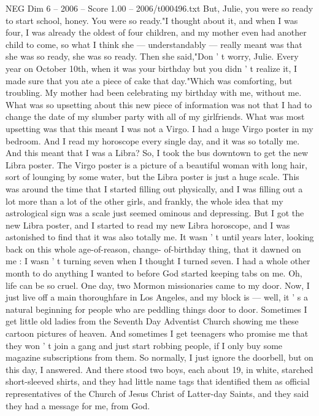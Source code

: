 \begin{textsample}{NEG Dim 6 – 2006 – Score 1.00 – 2006/t000496.txt}
But, Julie, you were so ready to start school, honey.
You were so ready."I thought about it, and when I was four, I was already the oldest of four children, and my mother even had another child to come, so what I think she — understandably — really meant was that she was so ready, she was so ready.
Then she said,"Don ' t worry, Julie.
Every year on October 10th, when it was your birthday but you didn ' t realize it, I made sure that you ate a piece of cake that day."Which was comforting, but troubling.
My mother had been celebrating my birthday with me, without me.
What was so upsetting about this new piece of information was not that I had to change the date of my slumber party with all of my girlfriends.
What was most upsetting was that this meant I was not a Virgo.
I had a huge Virgo poster in my bedroom.
And I read my horoscope every single day, and it was so totally me.
And this meant that I was a Libra?
So, I took the bus downtown to get the new Libra poster.
The Virgo poster is a picture of a beautiful woman with long hair, sort of lounging by some water, but the Libra poster is just a huge scale.
This was around the time that I started filling out physically, and I was filling out a lot more than a lot of the other girls, and frankly, the whole idea that my astrological sign was a scale just seemed ominous and depressing.
But I got the new Libra poster, and I started to read my new Libra horoscope, and I was astonished to find that it was also totally me.
It wasn ' t until years later, looking back on this whole age-of-reason, change- of-birthday thing, that it dawned on me : I wasn ' t turning seven when I thought I turned seven.
I had a whole other month to do anything I wanted to before God started keeping tabs on me.
Oh, life can be so cruel.
One day, two Mormon missionaries came to my door.
Now, I just live off a main thoroughfare in Los Angeles, and my block is — well, it ' s a natural beginning for people who are peddling things door to door.
Sometimes I get little old ladies from the Seventh Day Adventist Church showing me these cartoon pictures of heaven.
And sometimes I get teenagers who promise me that they won ' t join a gang and just start robbing people, if I only buy some magazine subscriptions from them.
So normally, I just ignore the doorbell, but on this day, I answered.
And there stood two boys, each about 19, in white, starched short-sleeved shirts, and they had little name tags that identified them as official representatives of the Church of Jesus Christ of Latter-day Saints, and they said they had a message for me, from God.

\end{textsample}
